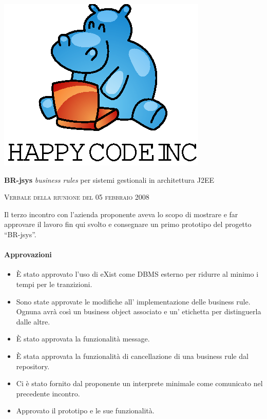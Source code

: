 \documentclass[11pt,titlepage,a4paper]{report}
\begin{document}
\begin{titlepage}
\begin{center}
\vspace*{0.5in}
\includegraphics{logo.eps}
\vspace*{0.2in}

{\Large \textbf{BR-jsys}}
{\Large \emph{business rules} per sistemi gestionali in architettura J2EE } 
\vspace{2in}

\Huge \textsc{ Verbale della riunione del 05 febbraio 2008 }

\end{center}
\end{titlepage}
\vspace*{0.5in}


Il terzo incontro con l'azienda proponente aveva lo scopo di mostrare e far approvare il lavoro fin qui svolto e consegnare un primo prototipo del progetto ``BR-jsys''.
\thispagestyle{plain}

\paragraph{Approvazioni}
\begin{itemize}
\item \`E stato approvato l'uso di eXist come DBMS esterno per ridurre al minimo i tempi per le tranzizioni.
\item Sono state approvate le modifiche all' implementazione delle business rule. Ognuna avr\`a cos\`i un business object associato e un' etichetta per distinguerla dalle altre.
\item \`E stato approvata la funzionalit\`a message.
\item \`E stata approvata la funzionalit\`a di cancellazione di una business rule dal repository.
\item Ci \`e stato fornito dal proponente un interprete minimale come comunicato nel precedente incontro.
\item Approvato il prototipo e le sue funzionalit\`a.
\end{itemize}
\end{document}
